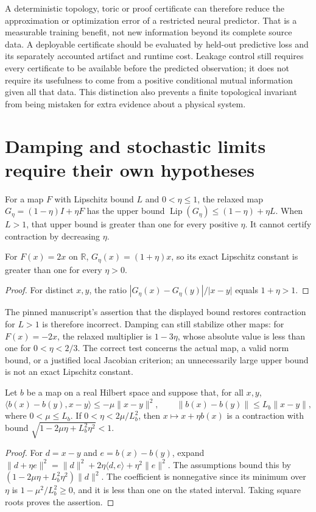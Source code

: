 A deterministic topology, toric or proof certificate can therefore reduce
the approximation or optimization error of a restricted neural predictor.
That is a measurable training benefit, not new information beyond its
complete source data. A deployable certificate should be evaluated by
held-out predictive loss and its separately accounted artifact and runtime
cost. Leakage control still requires every certificate to be available
before the predicted observation; it does not require its usefulness to
come from a positive conditional mutual information given all that data.
This distinction also prevents a finite topological invariant from being
mistaken for extra evidence about a physical system.

\section{Damping and stochastic limits require their own hypotheses}

For a map $F$ with Lipschitz bound $L$ and $0<\eta\le1$, the relaxed map
$G_\eta=(1-\eta)I+\eta F$ has the upper bound
$\operatorname{Lip}(G_\eta)\le(1-\eta)+\eta L$.
When $L>1$, that upper bound is greater than one for every positive $\eta$.
It cannot certify contraction by decreasing $\eta$.

\begin{proposition}
\label{prop:transport-damping-obstruction}
For $F(x)=2x$ on $\mathbb R$, $G_\eta(x)=(1+\eta)x$, so its exact
Lipschitz constant is greater than one for every $\eta>0$.
\end{proposition}
\begin{proof}
For distinct $x,y$, the ratio
$|G_\eta(x)-G_\eta(y)|/|x-y|$ equals $1+\eta>1$.
\end{proof}

The pinned manuscript's assertion that the displayed bound restores
contraction for $L>1$ is therefore incorrect. Damping can still stabilize
other maps: for $F(x)=-2x$, the relaxed multiplier is $1-3\eta$, whose
absolute value is less than one for $0<\eta<2/3$. The correct test concerns
the actual map, a valid norm bound, or a justified local Jacobian criterion;
an unnecessarily large upper bound is not an exact Lipschitz constant.

\begin{proposition}
\label{prop:transport-dissipative-relaxation}
Let $b$ be a map on a real Hilbert space and suppose that, for all $x,y$,
\[
 \langle b(x)-b(y),x-y\rangle\le-\mu\|x-y\|^2,
 \qquad \|b(x)-b(y)\|\le L_b\|x-y\|,
\]
where $0<\mu\le L_b$. If $0<\eta<2\mu/L_b^2$, then
$x\mapsto x+\eta b(x)$ is a contraction with bound
$\sqrt{1-2\mu\eta+L_b^2\eta^2}<1$.
\end{proposition}
\begin{proof}
For $d=x-y$ and $e=b(x)-b(y)$, expand
$\|d+\eta e\|^2=\|d\|^2+2\eta\langle d,e\rangle+\eta^2\|e\|^2$.
The assumptions bound this by
$(1-2\mu\eta+L_b^2\eta^2)\|d\|^2$.
The coefficient is nonnegative since its minimum over $\eta$ is
$1-\mu^2/L_b^2\ge0$, and it is less than one on the stated interval.
Taking square roots proves the assertion.
\end{proof}

